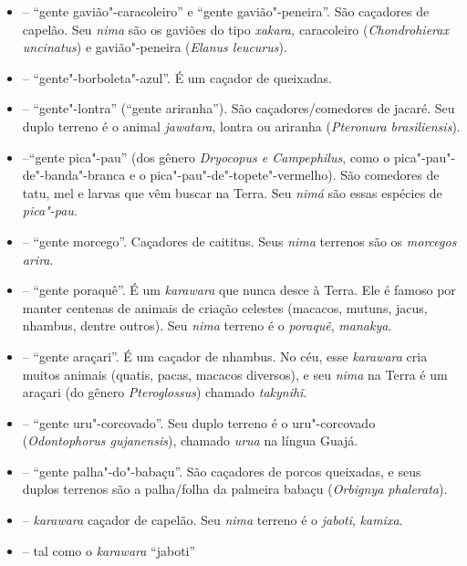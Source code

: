 \begin{itemize}
{  brachyurus}).
\item
  \emph{} -- ``gente gavião"-caracoleiro'' e ``gente
  gavião"-peneira''. São caçadores de capelão. Seu \emph{nima} são os
  gaviões do tipo \emph{xakara,} caracoleiro (\emph{Chondrohierax
  uncinatus}) e gavião"-peneira (\emph{Elanus leucurus}).
\item
  \emph{} -- ``gente"-borboleta"-azul''. É um caçador de
  queixadas.
\item
  \emph{} -- ``gente"-lontra'' (``gente ariranha'').
  São caçadores/comedores de jacaré. Seu duplo terreno é o animal
  \emph{jawatara}, lontra ou ariranha (\emph{Pteronura brasiliensis}).
\item
  \emph{} --``gente pica"-pau'' (dos gênero
  \emph{Dryocopus e Campephilus}, como o pica"-pau"-de"-banda"-branca e o
  pica"-pau"-de"-topete"-vermelho). São comedores de tatu, mel e larvas que
  vêm buscar na Terra. Seu \emph{nimá} são essas espécies de
  \emph{pica"-pau}.
\item
   -- ``gente morcego''. Caçadores de
  caititus. Seus \emph{nima} terrenos são os \emph{morcegos}
  \emph{arira}.
\item
  \emph{} -- ``gente poraquê''. É um \emph{karawara}
  que nunca desce à Terra. Ele é famoso por manter centenas de animais
  de criação celestes (macacos, mutuns, jacus, nhambus, dentre outros).
  Seu \emph{nima} terreno é o \emph{poraquê}, \emph{manakya}.
\item
  \emph{} -- ``gente araçari''. É um caçador de
  nhambus. No céu, esse \emph{karawara} cria muitos animais (quatis,
  pacas, macacos diversos), e seu \emph{nima} na Terra é um araçari (do
  gênero \emph{Pteroglossus}) chamado \emph{takynihĩ}.
\item
  \emph{} -- ``gente uru"-corcovado''. Seu duplo terreno
  é o uru"-corcovado (\emph{Odontophorus gujanensis}), chamado
  \emph{urua} na língua Guajá.
\item
  \emph{} -- ``gente palha"-do"-babaçu''. São
  caçadores de porcos queixadas, e seus duplos terrenos são a
  palha/folha da palmeira babaçu (\emph{Orbignya phalerata}).
\item
   -- \emph{karawara} caçador de capelão.
  Seu \emph{nima} terreno é o \emph{jaboti}, \emph{kamixa}.
\item
  \emph{} -- tal como o \emph{karawara} ``jaboti''

\end{itemize}
